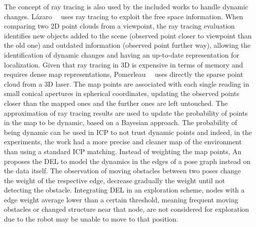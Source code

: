 The concept of ray tracing is also used by the included works to handle dynamic changes.
Lázaro~\etal~\cite{lázaro-et-al:2018:8594310} uses ray tracing to exploit the free space information. When comparing two 2D point clouds from a viewpoint, the ray tracing evaluation identifies new objects added to the scene (observed point closer to viewpoint than the old one) and outdated information (observed point further way), allowing the identification of dynamic changes and having an up-to-date representation for localization.
Given that ray tracing in 3D is expensive in terms of memory and requires dense map representations, Pomerleau~\etal~\cite{pomerleau-et-al:2014:6907397} uses directly the sparse point cloud from a 3D laser. The map points are associated with each single reading in small conical apertures in spherical coordinates, updating the observed points closer than the mapped ones and the further ones are left untouched. The approximation of ray tracing results are used to update the probability of points in the map to be dynamic, based on a Bayesian approach. The probability of being dynamic can be used in \gls{ICP} to not trust dynamic points and indeed, in the experiments, the work \cite{pomerleau-et-al:2014:6907397} had a more precise and cleaner map of the environment than using a standard \gls{ICP} matching.
Instead of weighting the map points, An~\etal~\cite{an-et-al:2016:0} proposes the \gls{DEL} to model the dynamics in the edges of a pose graph instead on the data itself. The observation of moving obstacles between two poses change the weight of the respective edge, decrease gradually the weight until not detecting the obstacle. Integrating \gls{DEL} in an exploration scheme, nodes with a edge weight average lower than a certain threshold, meaning frequent moving obstacles or changed structure near that node, are not considered for exploration due to the robot may be unable to move to that position.

